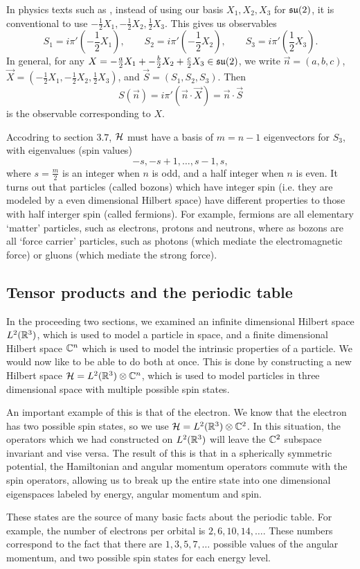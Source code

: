 \documentclass[a4paper]{article}
\begin{document}
In physics texts such as \cite{miller} \cite{woit}, instead of using our basis $X_1, X_2, X_3$ for $\mathfrak{su}(2)$, it is conventional to use $-\frac{1}{2}X_1, -\frac{1}{2}X_2, \frac{1}{2}X_3$. This gives us observables 
$$S_1 =i \pi'(-\frac{1}{2}X_1), \hspace{2em} S_2 =i \pi'(-\frac{1}{2}X_2), \hspace{2em} S_3 =i \pi'(\frac{1}{2}X_3).$$ In general, for any $X = -\frac{a}{2}X_1 + -\frac{b}{2} X_2 + \frac{c}{2} X_3 \in \mathfrak{su}(2)$, we write $\vec{n} = (a, b, c)$, $\vec{X} = (-\frac{1}{2}X_1, -\frac{1}{2}X_2, \frac{1}{2}X_3)$, and $\vec{S} = (S_1, S_2, S_3)$. Then 
$$S(\vec{n}) = i\pi'(\vec{n} \cdot \vec{X}) = \vec{n} \cdot \vec{S}$$
is the observable corresponding to $X$. 

Accodring to section $3.7$, $\mathcal{H}$ must have a basis of $m = n - 1$ eigenvectors for $S_3$, with eigenvalues (spin values)
$$-s,-s + 1, \hdots,s-1, s,$$
where $s = \frac{m}{2}$ is an integer when $n$ is odd, and a half integer when $n$ is even. It turns out \cite{woit} that particles (called bozons) which have integer spin (i.e. they are modeled by a even dimensional Hilbert space) have different properties to those with half interger spin (called fermions). For example, fermions are all elementary `matter' particles, such as electrons, protons and neutrons, where as bozons are all `force carrier' particles, such as photons (which mediate the electromagnetic force) or gluons (which mediate the strong force).

\subsection{Tensor products and the periodic table}
In the proceeding two sections, we examined an infinite dimensional Hilbert space $L^2(\mathbb{R}^3)$, which is used to model a particle in space, and a finite dimensional Hilbert space $\mathbb{C}^n$ which is used to model the intrinsic properties of a particle. We would now like to be able to do both at once. This is done by constructing a new Hilbert space $\mathcal{H} = L^2(\mathbb{R}^3) \otimes \mathbb{C}^n$, which is used to model particles in three dimensional space with multiple possible spin states. 

An important example of this is that of the electron. We know that the electron has two possible spin states, so we use $\mathcal{H} = L^2(\mathbb{R}^3) \otimes \mathbb{C}^2$. In this situation, the operators which we had constructed on $L^2(\mathbb{R}^3)$ will leave the $\mathbb{C}^2$ subspace invariant and vise versa. The result of this is that in a spherically symmetric potential, the Hamiltonian and angular momentum operators commute with the spin operators, allowing us to break up the entire state into one dimensional eigenspaces labeled by energy, angular momentum and spin. 

These states are the source of many basic facts about the periodic table. For example, the number of electrons per orbital is $2, 6, 10, 14, \hdots$. These numbers correspond to the fact that there are $1, 3, 5, 7, \hdots$ possible values of the angular momentum, and two possible spin states for each energy level.

\newpage
 

\end{document}
